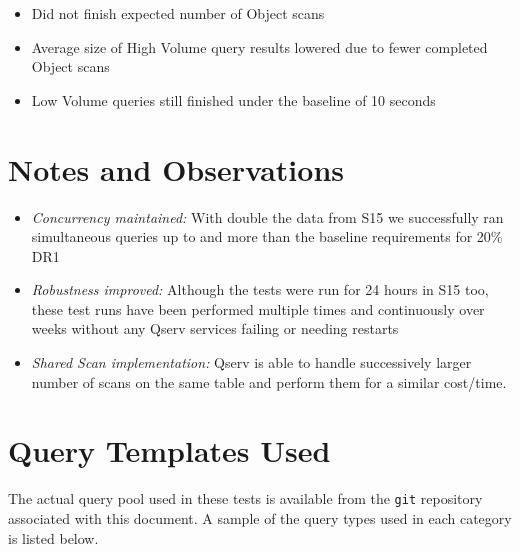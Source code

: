 \documentclass[DM,toc]{lsstdoc}
\begin{document}
\begin{itemize}
  \begin{itemize}
  \item
    Did not finish expected number of Object scans
  \item
    Average size of High Volume query results lowered due to fewer
    completed Object scans
  \item
    Low Volume queries still finished under the baseline of 10 seconds
  \end{itemize}
\end{itemize}

\section{Notes and Observations}\label{notes-and-observations}

\begin{itemize}
\item
  \emph{Concurrency maintained:} With double the data from S15 we
  successfully ran simultaneous queries up to and more than the baseline
  requirements for 20\% DR1
\item
  \emph{Robustness improved:} Although the tests were run for 24 hours
  in S15 too, these test runs have been performed multiple times and
  continuously over weeks without any Qserv services failing or needing
  restarts
\item
  \emph{Shared Scan implementation:} Qserv is able to handle
  successively larger number of scans on the same table and perform them
  for a similar cost/time.
\end{itemize}

\section{Query Templates Used}\label{query-templates-used}

The actual query pool used in these tests is available from the \texttt{git}
repository associated with this document.
A sample of the query types used in each category is listed below.
\end{document}
